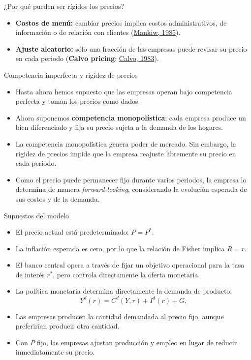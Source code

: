 \documentclass[aspectratio=169,11pt]{beamer}
\newcommand{\cidehighlight}[1]{\textcolor{CIDEBlue}{\bfseries #1}}
\begin{document}
\begin{frame}{¿Por qué pueden ser rígidos los precios?}
  \small
  \begin{itemize}
    \setlength{\itemsep}{0.52em}
    \item \textbf{Costos de menú:} cambiar precios implica costos administrativos, de información o de relación con clientes (\href{https://www.jstor.org/stable/1885395}{Mankiw, 1985}).
    \item \textbf{Ajuste aleatorio:} sólo una fracción de las empresas puede revisar su precio en cada periodo (\cidehighlight{Calvo pricing}: \href{https://www.sciencedirect.com/science/article/abs/pii/0304393283900600?via\%3Dihub}{Calvo, 1983}).
  \end{itemize}
\end{frame}


\begin{frame}{Competencia imperfecta y rigidez de precios}
  \begin{itemize}
    \item Hasta ahora hemos supuesto que las empresas operan bajo competencia perfecta y toman los precios como dados.
    
    \item Ahora suponemos \cidehighlight{competencia monopolística}: cada empresa produce un bien diferenciado y fija su precio sujeta a la demanda de los hogares.
    
    \item La competencia monopolística genera poder de mercado. Sin embargo, la rigidez de precios impide que la empresa reajuste libremente su precio en cada periodo.
    
    \item Como el precio puede permanecer fijo durante varios periodos, la empresa lo determina de manera \textit{forward-looking}, considerando la evolución esperada de sus costos y de la demanda.
  \end{itemize}
\end{frame}

\begin{frame}{Supuestos del modelo}
  \small
  \begin{itemize}
    \setlength{\itemsep}{0.52em}
    \item El precio actual está predeterminado: \(P= P^*\).
    \item La inflación esperada es cero, por lo que la relación de Fisher implica \(R=r\).
    \item El banco central opera a través de fijar un objetivo operacional para la tasa de interés \(r^*\), pero controla directamente la oferta monetaria.
    \item La política monetaria determina directamente la demanda de producto:
      \[
        Y^d(r)=C^d(Y,r)+I^d(r)+G,
      \]
    \item Las empresas producen la cantidad demandada al precio fijo, aunque preferirían producir otra cantidad.
    \item Con \(P\) fijo, las empresas ajustan producción y empleo en lugar de reducir inmediatamente su precio.
  \end{itemize}
\end{frame}
\end{document}
